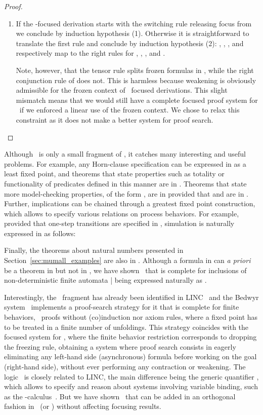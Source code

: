 \begin{proof}
\begin{enumerate}
\item
  If the -focused derivation starts with the switching rule releasing
  focus from  we conclude by induction hypothesis (1).
  Otherwise it is straightforward to translate the first rule and
  conclude by induction hypothesis (2):
  , , ,  and 
  respectively map to the right rules for
  , , ,  and .

  Note, however, that the tensor rule splits frozen formulas
  in , while the right conjunction rule of \muLJL{}
  does not. This is harmless because weakening is obviously admissible
  for the frozen context of \muLJL\ focused derivations.
  This slight mismatch means that we would still have a complete
  focused proof system for \muLJL\ if we enforced a linear use of
  the frozen context. We chose to relax this constraint as it does not
  make a better system for proof search.
\end{enumerate}
\vspace{-0.5cm}\end{proof}

Although \muLJL\ is only a small fragment of \muLJ,
it catches many interesting and useful problems.  For example, 
any Horn-clause specification can be expressed in  as a least
fixed point, and theorems that state properties such as totality or
functionality of predicates defined in this manner are in .
Theorems that state more model-checking properties, of the form
, are in  provided
that  and  are in .
Further, implications can be chained through a greatest fixed point
construction, which allows to specify various relations on
process behaviors.
For example, provided that one-step transitions  are specified
in , simulation is naturally expressed in  as follows:

Finally, the theorems about natural numbers presented in
Section~\ref{sec:mumall_examples} are also in .
Although a formula in  can \emph{a priori} be a theorem in \muLJ{}
but not in \muLJL,
we have shown~\cite{baelde09tableaux} that \muLJL{}
is complete for inclusions of non-deterministic finite automata |
 being expressed naturally as
.


Interestingly, the \muLJL\ fragment has already been identified in
LINC~\cite{tiu05eshol} and the Bedwyr system~\cite{baelde07cade}
implements a proof-search strategy for it that is complete for finite
behaviors, \ie\ proofs without (co)induction nor axiom rules,
where a fixed point has to be treated in a finite number of unfoldings.
This strategy coincides with the focused
system for \muLJL, where the finite behavior restriction corresponds
to dropping the freezing rule,
obtaining a system where proof search consists in
eagerly eliminating any left-hand side (asynchronous) formula
before working on the goal (right-hand side),
without ever performing any contraction or weakening.
The logic \muLJ\ is closely related to LINC, the main difference being
the generic quantifier , which allows to specify and reason about
systems involving variable binding,
such as the -calculus~\cite{tiu05concur}.
But we have shown~\cite{baelde08lfmtp} that  can be added
in an orthogonal fashion in \muLJ\ (or \mumall)
without affecting focusing results.

